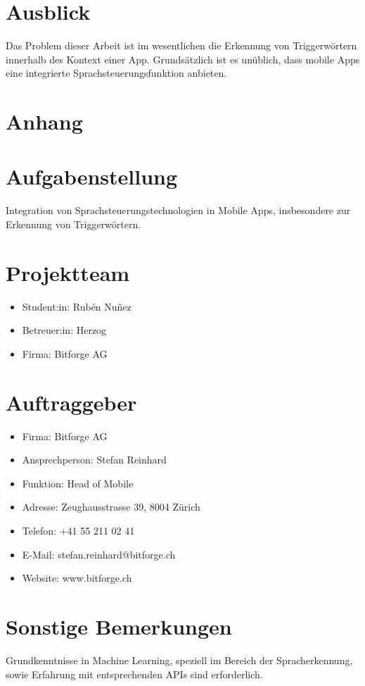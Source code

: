 \documentclass[11pt,a4paper]{article}
\newcommand\blankpage{%
	\null
	\thispagestyle{empty}%
	\addtocounter{page}{-1}%
	\newpage}
\begin{document}
\newpage \section{Ausblick}
Das Problem dieser Arbeit ist im wesentlichen die Erkennung von Triggerwörtern innerhalb
des Kontext einer App. Grundsätzlich ist es unüblich, dass mobile Apps eine
integrierte Sprachsteuerungsfunktion anbieten.

\newpage \section{Anhang}


\clearpage
\listoffigures
{}
\listoftables
\printbibliography[title=Literaturverzeichnis, heading=bibintoc]




\newpage
\pagecolor{ba-gray}
\afterpage{\nopagecolor}
\blankpage

\newpage

\section*{Aufgabenstellung}
Integration von Sprachsteuerungstechnologien in Mobile Apps, insbesondere zur Erkennung
von Triggerwörtern.

\section*{Projektteam}
\begin{itemize}
	\item Student:in: Rubén Nuñez
	\item Betreuer:in: Herzog
	\item Firma: Bitforge AG
\end{itemize}

\section*{Auftraggeber}
\begin{itemize}
	\item Firma: Bitforge AG
	\item Ansprechperson: Stefan Reinhard
	\item Funktion: Head of Mobile
	\item Adresse: Zeughausstrasse 39, 8004 Zürich
	\item Telefon: +41 55 211 02 41
	\item E-Mail: stefan.reinhard@bitforge.ch
	\item Website: www.bitforge.ch
\end{itemize}

\section*{Sonstige Bemerkungen}
Grundkenntnisse in Machine Learning, speziell im Bereich der Spracherkennung, sowie
Erfahrung mit entsprechenden APIs sind erforderlich.
\end{document}
